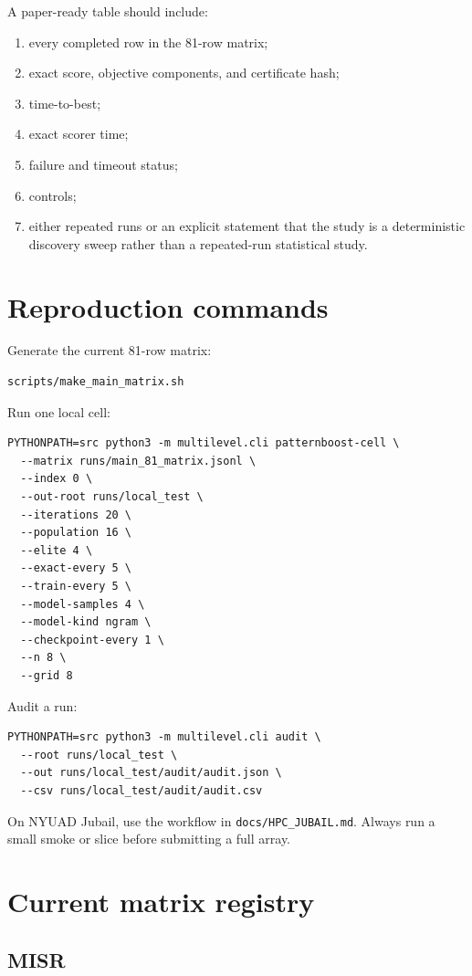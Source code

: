 \documentclass[11pt]{article}
\newcommand{\code}[1]{\texttt{#1}}
\begin{document}
A paper-ready table should include:
\begin{enumerate}
\item every completed row in the 81-row matrix;
\item exact score, objective components, and certificate hash;
\item time-to-best;
\item exact scorer time;
\item failure and timeout status;
\item controls;
\item either repeated runs or an explicit statement that the study is a
deterministic discovery sweep rather than a repeated-run statistical study.
\end{enumerate}

\section{Reproduction commands}

Generate the current 81-row matrix:
\begin{verbatim}
scripts/make_main_matrix.sh
\end{verbatim}

Run one local cell:
\begin{verbatim}
PYTHONPATH=src python3 -m multilevel.cli patternboost-cell \
  --matrix runs/main_81_matrix.jsonl \
  --index 0 \
  --out-root runs/local_test \
  --iterations 20 \
  --population 16 \
  --elite 4 \
  --exact-every 5 \
  --train-every 5 \
  --model-samples 4 \
  --model-kind ngram \
  --checkpoint-every 1 \
  --n 8 \
  --grid 8
\end{verbatim}

Audit a run:
\begin{verbatim}
PYTHONPATH=src python3 -m multilevel.cli audit \
  --root runs/local_test \
  --out runs/local_test/audit/audit.json \
  --csv runs/local_test/audit/audit.csv
\end{verbatim}

On NYUAD Jubail, use the workflow in \code{docs/HPC\_JUBAIL.md}.  Always run
a small smoke or slice before submitting a full array.

\appendix
\clearpage
\section{Current matrix registry}

\subsection{MISR}
\end{document}
